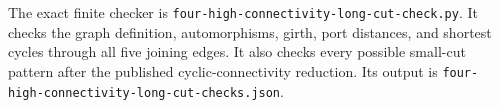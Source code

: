 The exact finite checker is \texttt{four-high-connectivity-long-cut-check.py}.
It checks the graph definition, automorphisms, girth, port distances, and shortest cycles through all five joining edges.
It also checks every possible small-cut pattern after the published cyclic-connectivity reduction.
Its output is \texttt{four-high-connectivity-long-cut-checks.json}.
